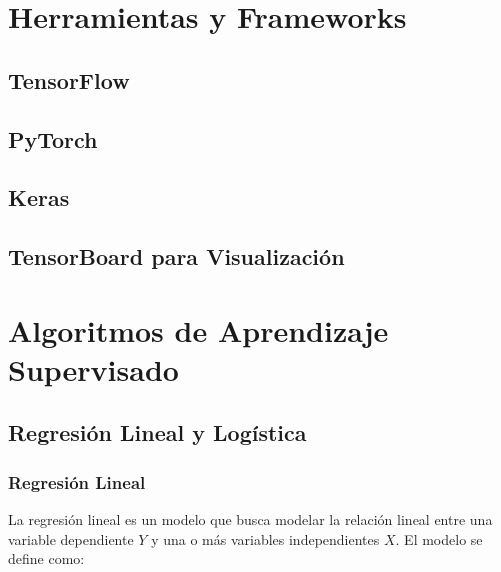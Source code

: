 \documentclass[12pt]{article}
\begin{document}
\section{Herramientas y Frameworks}


\subsection{TensorFlow}
\newpage
\subsection{PyTorch}
\newpage
\subsection{Keras}
\newpage
\subsection{TensorBoard para Visualización}
\newpage


\section{Algoritmos de Aprendizaje Supervisado}

\subsection{Regresión Lineal y Logística}
\subsubsection{Regresión Lineal}

La regresión lineal es un modelo que busca modelar la relación lineal entre una variable dependiente \(Y\) y una o más variables independientes \(X\). El modelo se define como:
\end{document}
